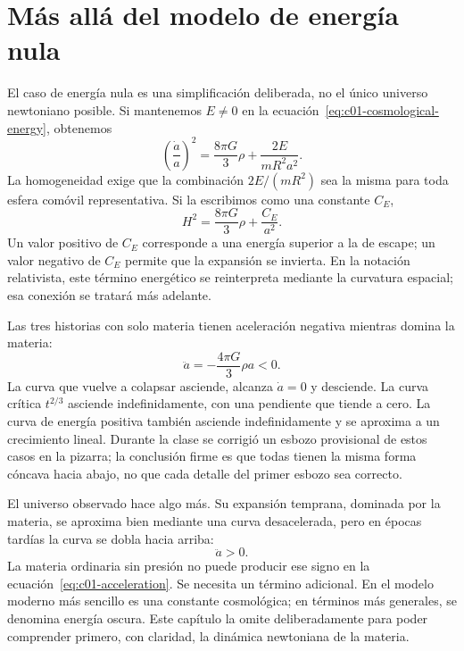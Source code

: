 \section{Más allá del modelo de energía nula}

El caso de energía nula es una simplificación deliberada, no el único universo newtoniano posible. Si mantenemos \(E\neq0\) en la ecuación~\eqref{eq:c01-cosmological-energy}, obtenemos
\begin{equation}
\left(\frac{\dot a}{a}\right)^2
=\frac{8\pi G}{3}\rho+\frac{2E}{mR^2a^2}.
\label{eq:c01-nonzero-energy}
\end{equation}
La homogeneidad exige que la combinación \(2E/(mR^2)\) sea la misma para toda esfera comóvil representativa. Si la escribimos como una constante \(C_E\),
\begin{equation}
H^2=\frac{8\pi G}{3}\rho+\frac{C_E}{a^2}.
\end{equation}
Un valor positivo de \(C_E\) corresponde a una energía superior a la de escape; un valor negativo de \(C_E\) permite que la expansión se invierta. En la notación relativista, este término energético se reinterpreta mediante la curvatura espacial; esa conexión se tratará más adelante.

Las tres historias con solo materia tienen aceleración negativa mientras domina la materia:
\begin{equation}
\ddot a=-\frac{4\pi G}{3}\rho a<0.
\end{equation}
La curva que vuelve a colapsar asciende, alcanza \(\dot a=0\) y desciende. La curva crítica \(t^{2/3}\) asciende indefinidamente, con una pendiente que tiende a cero. La curva de energía positiva también asciende indefinidamente y se aproxima a un crecimiento lineal. Durante la clase se corrigió un esbozo provisional de estos casos en la pizarra; la conclusión firme es que todas tienen la misma forma cóncava hacia abajo, no que cada detalle del primer esbozo sea correcto.

El universo observado hace algo más. Su expansión temprana, dominada por la materia, se aproxima bien mediante una curva desacelerada, pero en épocas tardías la curva se dobla hacia arriba:
\begin{equation}
\ddot a>0.
\end{equation}
La materia ordinaria sin presión no puede producir ese signo en la ecuación~\eqref{eq:c01-acceleration}. Se necesita un término adicional. En el modelo moderno más sencillo es una constante cosmológica; en términos más generales, se denomina energía oscura. Este capítulo la omite deliberadamente para poder comprender primero, con claridad, la dinámica newtoniana de la materia.

